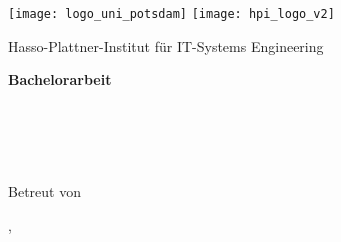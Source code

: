 \begin{titlepage}

\centering
\sffamily

\texttt{[image: logo\_uni\_potsdam]}
\hspace{2.5cm}
\texttt{[image: hpi\_logo\_v2]}
\vspace*{0.75cm}

\textsf{\Large Hasso-Plattner-Institut f\"ur IT-Systems Engineering}\\

\vspace{2cm}

\huge
\textbf{Bachelorarbeit}\\[0.4\baselineskip]
\huge
\textbf{\docTitle}\\[\baselineskip]
\Large 
\textbf{\docTitleEng}\\[\baselineskip]
\Large
\docAuthor\\[0.5\baselineskip]
{\normalsize \docAuthorMail}\\

\vfill

\large
Betreut von \docSupervisited
\\[1.0\baselineskip]
\docChair

\vspace{1cm}
\textsf{\docCity{}, \docDate}\\ %
\end{titlepage}
